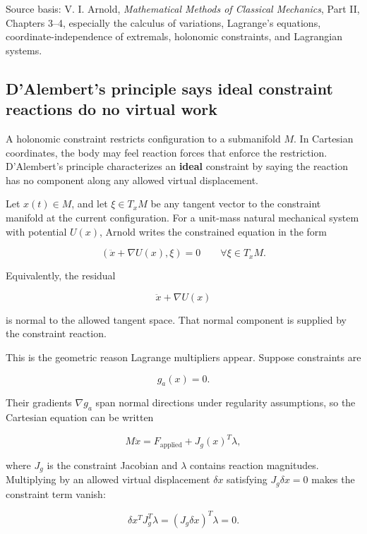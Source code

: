 Source basis: V. I. Arnold, \emph{Mathematical Methods of Classical Mechanics}, Part II, Chapters 3--4, especially the calculus of variations, Lagrange's equations, coordinate-independence of extremals, holonomic constraints, and Lagrangian systems.

\subsection{D'Alembert's principle says ideal constraint reactions do no virtual work}\label{02-foundations-ii-ch039-dalemberts-principle-says-ideal-constraint-reactions-do-no-virtual-work}

\hypertarget{02-foundations-ii-ch039-dalemberts-principle-says-ideal-constraint-reactions-do-no-virtual-work}{}

A holonomic constraint restricts configuration to a submanifold \(M\). In Cartesian coordinates, the body may feel reaction forces that enforce the restriction. D'Alembert's principle characterizes an \textbf{ideal} constraint by saying the reaction has no component along any allowed virtual displacement.

Let \(x(t)\in M\), and let \(\xi\in T_xM\) be any tangent vector to the constraint manifold at the current configuration. For a unit-mass natural mechanical system with potential \(U(x)\), Arnold writes the constrained equation in the form

\[
\left(
\ddot x+\nabla U(x),
\xi
\right)
=
0
\qquad
\forall \xi\in T_xM.
\]

Equivalently, the residual

\[
\ddot x+\nabla U(x)
\]

is normal to the allowed tangent space. That normal component is supplied by the constraint reaction.

This is the geometric reason Lagrange multipliers appear. Suppose constraints are

\[
g_a(x)=0.
\]

Their gradients \(\nabla g_a\) span normal directions under regularity assumptions, so the Cartesian equation can be written

\[
M\ddot x
=
F_{\mathrm{applied}}
+
J_g(x)^T\lambda,
\]

where \(J_g\) is the constraint Jacobian and \(\lambda\) contains reaction magnitudes. Multiplying by an allowed virtual displacement \(\delta x\) satisfying \(J_g\delta x=0\) makes the constraint term vanish:

\[
\delta x^T J_g^T\lambda
=
(J_g\delta x)^T\lambda
=
0.
\]

